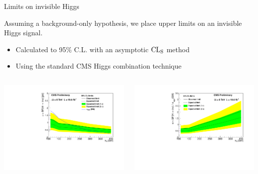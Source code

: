 \documentclass[8pt]{beamer}
\begin{document}
\begin{frame}{Limits on invisible Higgs}
 
Assuming a background-only hypothesis, we place upper limits on an invisible Higgs signal.  
\begin{itemize}
 \item Calculated to 95\% C.L. with an asymptotic ${\rm CL}_{\rm S}$ method
 \item Using the standard CMS Higgs combination technique
\end{itemize}
 
\begin{columns}
 
\begin{block}
 
\centering
\includegraphics[width=\linewidth]{img/XSLimit.pdf} 

\end{block}

\begin{block}
 
\centering
\includegraphics[width=\linewidth]{img/xsiLimit.pdf} 


\end{block}
\end{columns}
\end{frame}
\end{document}
